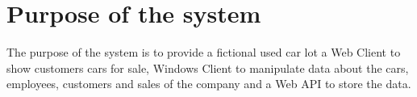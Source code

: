 \section{Purpose of the system}
The purpose of the system is to provide a fictional used car lot a Web Client to show customers cars for sale, Windows Client to manipulate data about the cars, employees, customers and sales of the company and a Web API to store the data. 